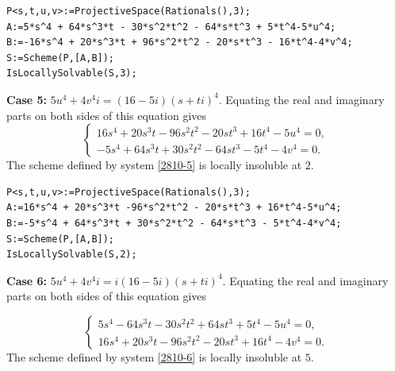 \documentclass[a4paper,12pt,english,reqno]{amsart}
\begin{document}

\begin{lstlisting}
P<s,t,u,v>:=ProjectiveSpace(Rationals(),3);
A:=5*s^4 + 64*s^3*t - 30*s^2*t^2 - 64*s*t^3 + 5*t^4-5*u^4;
B:=-16*s^4 + 20*s^3*t + 96*s^2*t^2 - 20*s*t^3 - 16*t^4-4*v^4;
S:=Scheme(P,[A,B]);
IsLocallySolvable(S,3);
\end{lstlisting}

{\bf Case 5:} $5u^4+4v^4i=(16-5i)(s+ti)^4$. Equating the real and imaginary parts on both sides of this equation gives
\begin{equation}\label{2810-5}
\begin{cases}
16s^4 + 20s^3t - 96s^2t^2 - 20st^3 + 16t^4 - 5u^4=0,\\
-5s^4 + 64s^3t + 30s^2t^2 - 64st^3 - 5t^4 - 4v^4=0.
\end{cases}
\end{equation}
The scheme defined by system \eqref{2810-5} is locally insoluble at $2$.


\begin{lstlisting}
P<s,t,u,v>:=ProjectiveSpace(Rationals(),3);
A:=16*s^4 + 20*s^3*t -96*s^2*t^2 - 20*s*t^3 + 16*t^4-5*u^4;
B:=-5*s^4 + 64*s^3*t + 30*s^2*t^2 - 64*s*t^3 - 5*t^4-4*v^4;
S:=Scheme(P,[A,B]);
IsLocallySolvable(S,2);
\end{lstlisting}
{\bf Case 6:} $5u^4+4v^4i=i(16-5i)(s+ti)^4$. Equating the real and imaginary parts on both sides of this equation gives

\begin{equation}\label{2810-6}
\begin{cases}
5s^4 - 64s^3t - 30s^2t^2 + 64st^3 + 5t^4 - 5u^4=0,\\
16s^4 + 20s^3t - 96s^2t^2 - 20st^3 + 16t^4 - 4v^4=0.
\end{cases}
\end{equation}
The scheme defined by system \eqref{2810-6} is locally insoluble at $5$.
\end{document}
